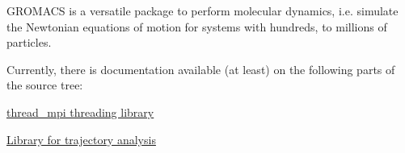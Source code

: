 \-G\-R\-O\-M\-A\-C\-S is a versatile package to perform molecular dynamics, i.\-e. simulate the \-Newtonian equations of motion for systems with hundreds, to millions of particles.

\-Currently, there is documentation available (at least) on the following parts of the source tree\-:
\begin{DoxyItemize}
\item \hyperlink{thread_mpi}{thread\-\_\-mpi threading library}
\item \hyperlink{libtrajana}{\-Library for trajectory analysis} 
\end{DoxyItemize}